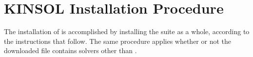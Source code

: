 \chapter{KINSOL Installation Procedure}\label{s:install}

The installation of {\kinsol} is accomplished by installing the
{\sundials} suite as a whole, according to the instructions that
follow.   The same procedure applies whether or not the downloaded
file contains solvers other than {\kinsol}.

